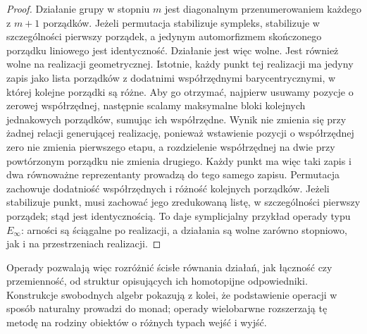 \begin{proof}
Działanie grupy w stopniu $m$ jest diagonalnym przenumerowaniem każdego z $m+1$ porządków. Jeżeli permutacja stabilizuje sympleks, stabilizuje w szczególności pierwszy porządek, a jedynym automorfizmem skończonego porządku liniowego jest identyczność. Działanie jest więc wolne. Jest również wolne na realizacji geometrycznej. Istotnie, każdy punkt tej realizacji ma jedyny zapis jako lista porządków z dodatnimi współrzędnymi barycentrycznymi, w której kolejne porządki są różne. Aby go otrzymać, najpierw usuwamy pozycje o zerowej współrzędnej, następnie scalamy maksymalne bloki kolejnych jednakowych porządków, sumując ich współrzędne. Wynik nie zmienia się przy żadnej relacji generującej realizację, ponieważ wstawienie pozycji o współrzędnej zero nie zmienia pierwszego etapu, a rozdzielenie współrzędnej na dwie przy powtórzonym porządku nie zmienia drugiego. Każdy punkt ma więc taki zapis i dwa równoważne reprezentanty prowadzą do tego samego zapisu. Permutacja zachowuje dodatniość współrzędnych i różność kolejnych porządków. Jeżeli stabilizuje punkt, musi zachować jego zredukowaną listę, w szczególności pierwszy porządek; stąd jest identycznością. To daje symplicjalny przykład operady typu $E_\infty$: arności są ściągalne po realizacji, a działania są wolne zarówno stopniowo, jak i na przestrzeniach realizacji.
\end{proof}

Operady pozwalają więc rozróżnić ścisłe równania działań, jak łączność czy przemienność, od struktur opisujących ich homotopijne odpowiedniki. Konstrukcje swobodnych algebr pokazują z kolei, że podstawienie operacji w sposób naturalny prowadzi do monad; operady wielobarwne rozszerzają tę metodę na rodziny obiektów o różnych typach wejść i wyjść.
